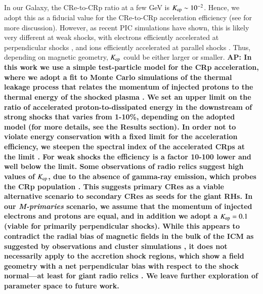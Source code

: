 \documentclass[useAMS,usenatbib]{mn2e}
\def\AP#1{{\bf  AP: #1}}
\begin{document}
In our Galaxy, the CRe-to-CRp ratio at a few GeV is $K_{{\mathrm{ep}}} \sim
10^{-2}$. Hence, we adopt this as a fiducial value for the CRe-to-CRp
acceleration efficiency (see \citep{pinzke13} for more
discussion). However, as recent PIC simulations have shown, this is
likely very different at weak shocks, with electrons efficiently
accelerated at perpendicular shocks
\citep{2014ApJ...794..153G,2014ApJ...797...47G}, and ions efficiently
accelerated at parallel shocks \citep{2014ApJ...783...91C}. Thus,
depending on magnetic geometry, $K_{{\mathrm{ep}}}$ could be either larger
or smaller. \AP{In this work we use a simple test-particle model for
  the CRp acceleration, where we adopt a fit to Monte Carlo
  simulations of the thermal leakage process that relates the momentum
  of injected protons to the thermal energy of the shocked plasma
  \citep{kang11}. We set an upper limit on the ratio of accelerated
  proton-to-dissipated energy in the downstream of strong shocks that
  varies from 1-10\%, depending on the adopted model (for more
  details, see the Results section). In order not to violate energy
  conservation with a fixed limit for the acceleration efficiency, we
  steepen the spectral index of the accelerated CRps at the limit
  \citep{pinzke13}. For weak shocks the efficiency is a factor 10-100
  lower and well below the limit. Some observations of radio relics
  suggest high values of $K_{{\mathrm{ep}}}$, due to the absence of
  gamma-ray emission, which probes the CRp population
  \citep{2014MNRAS.437.2291V}. This suggests primary CRes as a viable
  alternative scenario to secondary CRes as seeds for the giant
  RHs. In our {\it M-primaries} scenario, we assume that the momentum
  of injected electrons and protons are equal, and in addition we
  adopt a $K_{{\mathrm{ep}}} =0.1$ (viable for primarily perpendicular
  shocks). While this appears to contradict the radial bias of
  magnetic fields in the bulk of the ICM as suggested by observations
  \citep{2010NatPh...6..520P} and cluster simulations
  \citep{2011ApJ...740...81R}, it does not necessarily apply to the
  accretion shock regions, which show a field geometry with a net
  perpendicular bias with respect to the shock normal---at least for
  giant radio relics \citep{2010Sci...330..347V}. We leave further
  exploration of parameter space to future work.}
\end{document}
